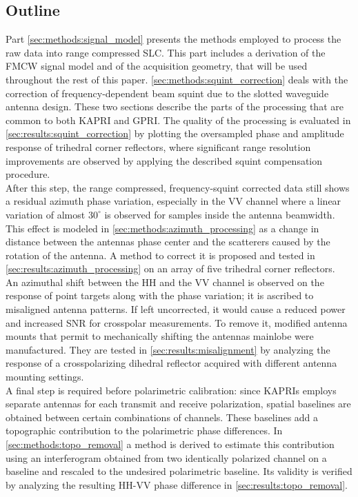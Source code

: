 \subsection{Outline}
Part \ref{sec:methods:signal_model} presents  the methods employed to process the raw data into range compressed SLC. This part includes a derivation of the FMCW signal model and of the acquisition geometry, that will be used throughout the rest of this paper. \autoref{sec:methods:squint_correction} deals with the correction of frequency-dependent beam squint due to the slotted waveguide antenna design. These two sections describe the parts of the processing that are common to both KAPRI and GPRI. The quality of the processing is evaluated in \autoref{sec:results:squint_correction} by plotting the oversampled phase and amplitude response of trihedral corner reflectors, where significant range resolution improvements are observed by applying the described squint compensation procedure.\\
After this step, the range compressed, frequency-squint corrected data still shows a residual azimuth phase variation, especially in the VV channel where a linear variation of almost $30^\circ$ is observed for samples inside the antenna beamwidth. This effect is modeled in \autoref{sec:methods:azimuth_processing} as a change in distance between the antennas phase center and the scatterers caused by the rotation of the antenna. A method to correct it is proposed and tested in \autoref{sec:results:azimuth_processing} on an array of five trihedral corner reflectors.\\ An azimuthal shift between the HH and the VV channel is observed on the  response of point targets along with the phase variation; it is ascribed to misaligned antenna patterns. If left uncorrected, it would cause a reduced power and increased SNR for crosspolar measurements. To remove it, modified antenna mounts that permit to mechanically shifting the antennas mainlobe were manufactured. They are tested in \autoref{sec:results:misalignment} by analyzing the response of a crosspolarizing dihedral reflector acquired with different antenna mounting settings.\\
A final step is required before polarimetric calibration: since KAPRIs employs separate antennas for each transmit and receive polarization, spatial baselines are obtained between certain combinations of channels. These baselines add a topographic contribution to the polarimetric phase differences. In \autoref{sec:methods:topo_removal} a method is derived to estimate this contribution using an interferogram obtained from two identically polarized channel on a baseline and rescaled to the undesired polarimetric baseline. Its validity is verified by analyzing the resulting HH-VV phase difference in \autoref{sec:results:topo_removal}.\\
